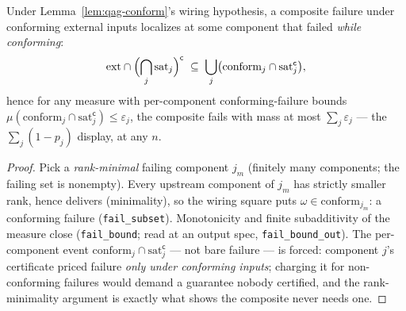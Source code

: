 \begin{blemma}
\label{lem:qag-union}
Under Lemma~\ref{lem:qag-conform}'s wiring hypothesis, a composite
failure under conforming external inputs localizes at some component
that failed \emph{while conforming}:
\[
\mathrm{ext} \cap \Bigl(\bigcap_j \mathrm{sat}_j\Bigr)^{\mathsf{c}}
\;\subseteq\;
\bigcup_j \bigl(\mathrm{conform}_j \cap \mathrm{sat}_j^{\mathsf{c}}\bigr),
\]
hence for any measure with per-component conforming-failure bounds
$\mu(\mathrm{conform}_j \cap \mathrm{sat}_j^{\mathsf{c}}) \leq
\varepsilon_j$, the composite fails with mass at most
$\sum_j \varepsilon_j$ --- the $\sum_j (1 - p_j)$ display, at any $n$.
\end{blemma}
\begin{proof}
Pick a \emph{rank-minimal} failing component $j_m$ (finitely many
components; the failing set is nonempty). Every upstream component of
$j_m$ has strictly smaller rank, hence delivers (minimality), so the
wiring square puts $\omega \in \mathrm{conform}_{j_m}$: a conforming
failure (\texttt{fail\_subset}). Monotonicity and finite subadditivity
of the measure close (\texttt{fail\_bound}; read at an output spec,
\texttt{fail\_bound\_out}). The per-component event
$\mathrm{conform}_j \cap \mathrm{sat}_j^{\mathsf{c}}$ --- not bare
failure --- is forced: component $j$'s certificate priced failure
\emph{only under conforming inputs}; charging it for
non-conforming failures would demand a guarantee nobody certified,
and the rank-minimality argument is exactly what shows the composite
never needs one.
\end{proof}

